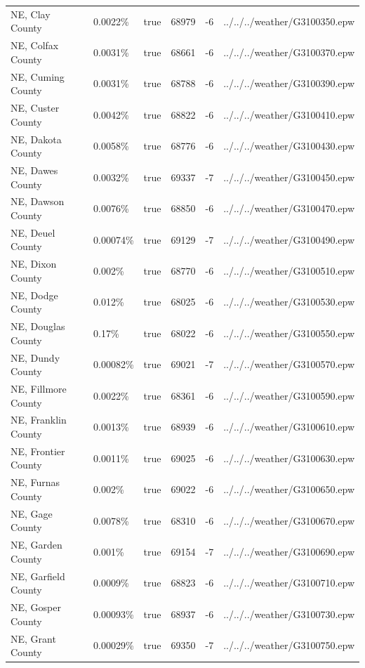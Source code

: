 \begin{longtable}[]{@{}llllll@{}}
NE, Clay County & 0.0022\% & true & 68979 & -6 &
../../../weather/G3100350.epw \\
NE, Colfax County & 0.0031\% & true & 68661 & -6 &
../../../weather/G3100370.epw \\
NE, Cuming County & 0.0031\% & true & 68788 & -6 &
../../../weather/G3100390.epw \\
NE, Custer County & 0.0042\% & true & 68822 & -6 &
../../../weather/G3100410.epw \\
NE, Dakota County & 0.0058\% & true & 68776 & -6 &
../../../weather/G3100430.epw \\
NE, Dawes County & 0.0032\% & true & 69337 & -7 &
../../../weather/G3100450.epw \\
NE, Dawson County & 0.0076\% & true & 68850 & -6 &
../../../weather/G3100470.epw \\
NE, Deuel County & 0.00074\% & true & 69129 & -7 &
../../../weather/G3100490.epw \\
NE, Dixon County & 0.002\% & true & 68770 & -6 &
../../../weather/G3100510.epw \\
NE, Dodge County & 0.012\% & true & 68025 & -6 &
../../../weather/G3100530.epw \\
NE, Douglas County & 0.17\% & true & 68022 & -6 &
../../../weather/G3100550.epw \\
NE, Dundy County & 0.00082\% & true & 69021 & -7 &
../../../weather/G3100570.epw \\
NE, Fillmore County & 0.0022\% & true & 68361 & -6 &
../../../weather/G3100590.epw \\
NE, Franklin County & 0.0013\% & true & 68939 & -6 &
../../../weather/G3100610.epw \\
NE, Frontier County & 0.0011\% & true & 69025 & -6 &
../../../weather/G3100630.epw \\
NE, Furnas County & 0.002\% & true & 69022 & -6 &
../../../weather/G3100650.epw \\
NE, Gage County & 0.0078\% & true & 68310 & -6 &
../../../weather/G3100670.epw \\
NE, Garden County & 0.001\% & true & 69154 & -7 &
../../../weather/G3100690.epw \\
NE, Garfield County & 0.0009\% & true & 68823 & -6 &
../../../weather/G3100710.epw \\
NE, Gosper County & 0.00093\% & true & 68937 & -6 &
../../../weather/G3100730.epw \\
NE, Grant County & 0.00029\% & true & 69350 & -7 &
../../../weather/G3100750.epw \\

\end{longtable}
